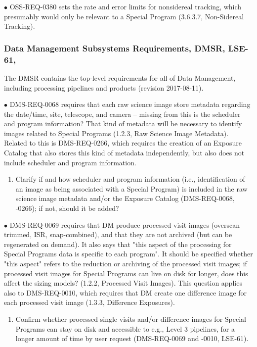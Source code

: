 \documentclass[DM,lsstdraft,toc]{lsstdoc}
\begin{document}
$\bullet$ OSS-REQ-0380 sets the rate and error limits for nonsidereal tracking, which presumably would only be relevant to a Special Program (3.6.3.7, Non-Sidereal Tracking).


\subsubsection{Data Management Subsystems Requirements, DMSR, LSE-61, \cite{LSE-61}}\label{sssec:dmplans_review_dmsr}

The DMSR contains the top-level requirements for all of Data Management, including processing pipelines and products (revision 2017-08-11).

$\bullet$ DMS-REQ-0068 requires that each raw science image store metadata regarding the date/time, site, telescope, and camera -- missing from this is the scheduler and program information? That kind of metadata will be necessary to identify images related to Special Programs (1.2.3, Raw Science Image Metadata). Related to this is DMS-REQ-0266, which requires the creation of an Exposure Catalog that also stores this kind of metadata independently, but also does not include scheduler and program information. 
\begin{enumerate}[topsep=-10pt,after=\vspace{10pt},label= \textbf{Concern \Roman*.},resume] \item \label{DMSR-1} Clarify if and how scheduler and program information (i.e., identification of an image as being associated with a Special Program) is included in the raw science image metadata and/or the Exposure Catalog (DMS-REQ-0068, -0266); if not, should it be added? \end{enumerate}

$\bullet$ DMS-REQ-0069 requires that DM produce processed visit images (overscan trimmed, ISR, snap-combined), and that they are not archived (but can be regenerated on demand). It also says that "this aspect of the processing for Special Programs data is specific to each program". It should be specified whether "this aspect" refers to the reduction or archiving of the processed visit images; if processed visit images for Special Programs can live on disk for longer, does this affect the sizing models? (1.2.2, Processed Visit Images). This question applies also to DMS-REQ-0010, which requires that DM create one difference image for each processed visit image (1.3.3, Difference Exposures).
\begin{enumerate}[topsep=-10pt,after=\vspace{10pt},label= \textbf{Concern \Roman*.},resume] \item \label{DMSR-2} Confirm whether processed single visits and/or difference images for Special Programs can stay on disk and accessible to e.g., Level 3 pipelines, for a longer amount of time by user request (DMS-REQ-0069 and -0010, LSE-61). \end{enumerate}
\end{document}
